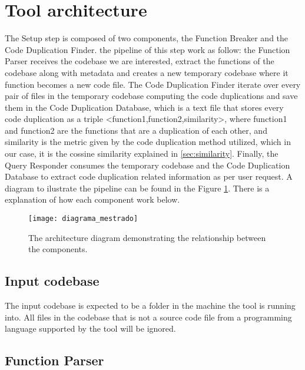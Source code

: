 \en

\section{Tool architecture}
\label{subsec:architecture}

The Setup step is composed of two components, the Function Breaker and the Code Duplication Finder. the pipeline of this step work as
follow: the Function Parser receives the codebase we are interested, extract the functions of the codebase along with metadata and
creates a new temporary codebase where it function becomes a new code file. The Code Duplication Finder iterate over every pair of 
files in the temporary codebase computing the code duplications and save them in the Code Duplication Database, which is a text file
that stores every code duplication as a triple <function1,function2,similarity>, where function1 and function2 are the functions that 
are a duplication of each other, and similarity is the metric given by the code duplication method utilized, which in our case, it is
the cossine similarity explained in \ref{sec:similarity}. Finally, the Query Responder consumes the temporary codebase and the 
Code Duplication Database to extract code duplication related information as per user request. A diagram to ilustrate the pipeline
can be found in the Figure \ref{fig:diagram}. There is a explanation of how each component work below.

\begin{figure}
\texttt{[image: diagrama\_mestrado]}
\caption{The architecture diagram demonstrating the relationship between the components.}
\label{fig:diagram}
\end{figure}

\subsection{Input codebase}

The input codebase is expected to be a folder in the machine the tool is running into. All files in the codebase that is not a source
code file from a programming language supported by the tool will be ignored.

\subsection{Function Parser}


